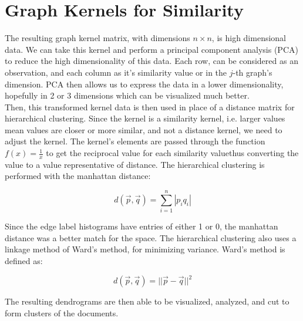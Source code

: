 %
%
%

\section{Graph Kernels for Similarity}

The resulting graph kernel matrix, with dimensions $n \times n$, is high dimensional data. We can take this kernel and perform a principal component analysis (PCA) to reduce the high dimensionality of this data. Each row, can be considered as an observation, and each column as it's similarity value or in the $j$-th graph's dimension. PCA then allows us to express the data in a lower dimensionality, hopefully in 2 or 3 dimensions which can be visualized much better. \\
Then, this transformed kernel data is then used in place of a distance matrix for hierarchical clustering. Since the kernel is a similarity kernel, i.e. larger values mean values are closer or more similar, and not a distance kernel, we need to adjust the kernel. The kernel's elements are passed through the function $f(x) = \frac{1}{x}$ to get the reciprocal value for each similarity value\textemdash thus converting the value to a value representative of distance. The hierarchical clustering is performed with the manhattan distance: 

\begin{equation}
d(\vec{p},\vec{q}) = \sum_{i=1}^n |p_i q_i|
\end{equation}

Since the edge label histograms have entries of either 1 or 0, the manhattan distance was a better match for the space. The hierarchical clustering also uses a linkage method of Ward's method, for minimizing variance. Ward's method is defined as:

\begin{equation}
d(\vec{p},\vec{q}) = || \vec{p} - \vec{q} ||^2
\end{equation}

The resulting dendrograms are then able to be visualized, analyzed, and cut to form clusters of the documents. 